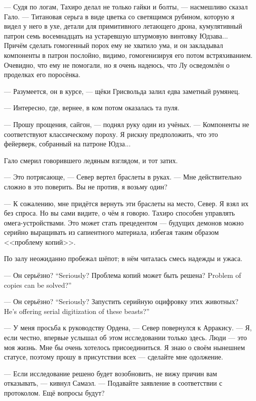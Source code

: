 --- Судя по логам, Тахиро делал не только гайки и болты, --- насмешливо сказал Гало.
--- Титановая серьга в виде цветка со светящимся рубином, которую я видел у него в ухе, детали для примитивного летающего дрона, кумулятивный патрон семь восемнадцать на устаревшую штурмовую винтовку Юдзава...
Причём сделать гомогенный порох ему не хватило ума, и он закладывал компоненты в патрон послойно, видимо, гомогенизируя его потом встряхиванием.
Очевидно, что ему не помогали, но я очень надеюсь, что Лу осведомлён о проделках его поросёнка.

--- Разумеется, он в курсе, --- щёки Грисвольда залил едва заметный румянец.

--- Интересно, где, вернее, в ком потом оказалась та пуля.

--- Прошу прощения, сайгон, --- поднял руку один из учёных.
--- Компоненты не соответствуют классическому пороху.
Я рискну предположить, что это фейерверк, собранный на патроне Юдза...

Гало смерил говорившего ледяным взглядом, и тот затих.

--- Это потрясающе, --- Север вертел браслеты в руках.
--- Мне действительно сложно в это поверить.
Вы не против, я возьму один?

--- К сожалению, мне придётся вернуть эти браслеты на место, Север.
Я взял их без спроса.
Но вы сами видите, о чём я говорю.
Тахиро способен управлять омега-устройствами.
Это может стать прецедентом --- будущих демонов можно серийно выращивать из сапиентного материала, избегая таким образом <<проблему копий>>.

По залу неожиданно пробежал шёпот;
в нём читалась смесь надежды и ужаса.

{--- Он серьёзно?}
{``Seriously?}
{Проблема копий может быть решена?}
{Problem of copies can be solved?''}

{--- Он серьёзно?}
{``Seriously?}
{Запустить серийную оцифровку этих животных?}
{He's offering serial digitization of these beasts?''}

--- У меня просьба к руководству Ордена, --- Север повернулся к Арракису.
--- Я, если честно, впервые услышал об этом исследовании только здесь.
Люди --- это моя жизнь.
Мне бы очень хотелось присоединиться.
Я знаю о своём нынешнем статусе, поэтому прошу в присутствии всех --- сделайте мне одолжение.

--- Если исследование решено будет возобновить, не вижу причин вам отказывать, --- кивнул Самаэл.
--- Подавайте заявление в соответствии с протоколом.
Ещё вопросы будут?

